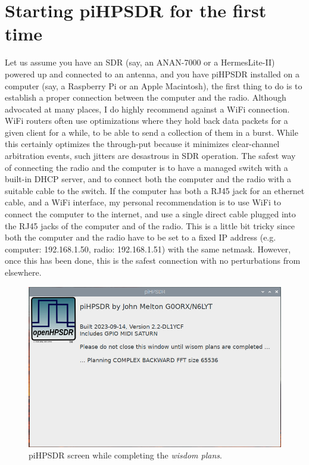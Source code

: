 \documentclass[12pt]{book}
\begin{document}
\chapter{Starting piHPSDR for the first time}
Let us assume you have an SDR (say, an ANAN-7000 or a HermesLite-II) powered up and connected to an antenna,
and you have piHPSDR installed on a computer (say, a Raspberry Pi or an Apple Macintosh), the first thing to
do is to establish a proper connection between the computer and the radio. Although advocated at many 
places,
I do highly recommend against a WiFi connection. WiFi routers often use optimizations where they hold
back data packets for a given client for a while, to be able to send a collection of them in a burst. While
this certainly optimizes the through-put because it minimizes clear-channel arbitration events, such jitters
are desastrous in SDR operation. The safest way of connecting the radio and the computer is to have a
managed switch with a built-in DHCP server, and to connect both the computer and the radio with a suitable
cable to the switch. If the computer has both a RJ45 jack for an ethernet cable, and a WiFi interface, my
personal recommendation is to use WiFi to connect the computer to the internet, and use a single direct 
cable plugged
into the RJ45 jacks of the computer and of the radio. This is a little bit tricky since both the computer
and the radio have to be set to a fixed IP address (e.g. computer: 192.168.1.50, radio: 192.168.1.51) with
the same netmask. However, once this has been done, this is the safest connection with no perturbations from
elsewhere.

\begin{figure}
\center
\includegraphics[width=12cm]{Planning.png}
\caption{piHPSDR screen while completing the \textit{wisdom plans}.}
\label{fig:Planning}
\end{figure}
\end{document}
